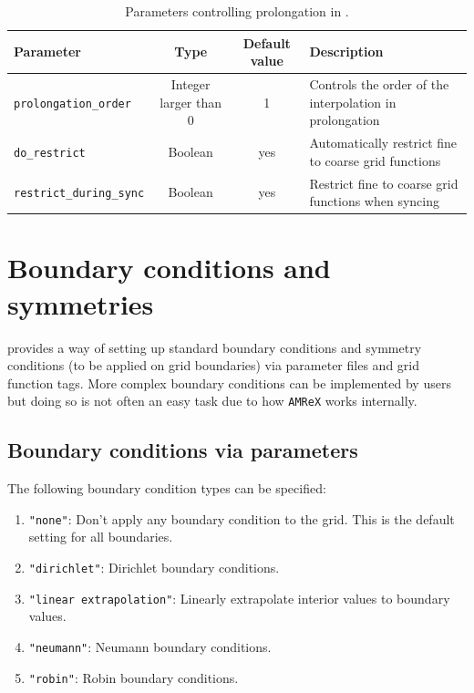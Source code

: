 \begin{table}[ht]
  \centering
  \begin{tabularx}{\textwidth}{lccX}
    Parameter                       & Type                  & Default value & Description                                             \\\hline\hline
    \texttt{prolongation\_order}    & Integer larger than 0 & 1             & Controls the order of the interpolation in prolongation \\
    \texttt{do\_restrict}           & Boolean               & yes           & Automatically restrict fine to coarse grid functions    \\
    \texttt{restrict\_during\_sync} & Boolean               & yes           & Restrict fine to coarse grid functions when syncing     \\
  \end{tabularx}
  \caption{Parameters controlling prolongation in \CarpetX.}
  \label{tab:other_prolongation_params}
\end{table}

\section{Boundary conditions and symmetries}
\label{sec:bcs}

\CarpetX\space provides a way of setting up standard boundary conditions and symmetry conditions (to be applied on grid boundaries) via parameter files and grid function tags. More complex boundary conditions can be implemented by users but doing so is not often an easy task due to how \texttt{AMReX} works internally.

\subsection{Boundary conditions via parameters}

The following boundary condition types can be specified:

\begin{enumerate}
    \item \texttt{"none"}: Don't apply any boundary condition to the grid. This is the default setting for all boundaries.
    \item \texttt{"dirichlet"}: Dirichlet boundary conditions.
    \item \texttt{"linear extrapolation"}: Linearly extrapolate interior values to boundary values.
    \item \texttt{"neumann"}: Neumann boundary conditions.
    \item \texttt{"robin"}: Robin boundary conditions.
\end{enumerate}

